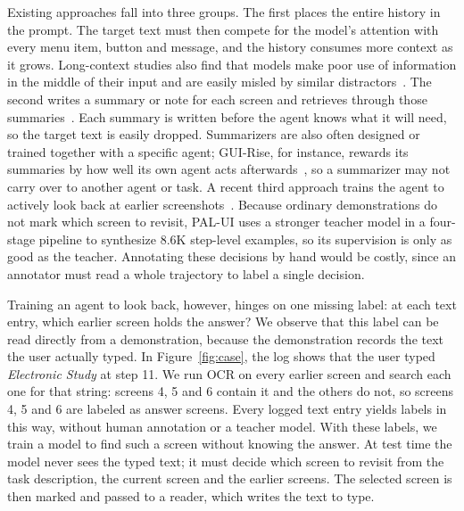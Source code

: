 \documentclass{article}
\begin{document}
Existing approaches fall into three groups. The first places the entire history in the prompt. The target text must then compete for the model's attention with every menu item, button and message, and the history consumes more context as it grows. Long-context studies also find that models make poor use of information in the middle of their input and are easily misled by similar distractors~\citep{lost,ruler,haystacks}. The second writes a summary or note for each screen and retrieves through those summaries~\citep{readagent,memgpt,mobileagente}. Each summary is written before the agent knows what it will need, so the target text is easily dropped. Summarizers are also often designed or trained together with a specific agent; GUI-Rise, for instance, rewards its summaries by how well its own agent acts afterwards~\citep{guirise}, so a summarizer may not carry over to another agent or task. A recent third approach trains the agent to actively look back at earlier screenshots~\citep{palui}. Because ordinary demonstrations do not mark which screen to revisit, PAL-UI uses a stronger teacher model in a four-stage pipeline to synthesize 8.6K step-level examples, so its supervision is only as good as the teacher. Annotating these decisions by hand would be costly, since an annotator must read a whole trajectory to label a single decision.

Training an agent to look back, however, hinges on one missing label: at each text entry, which earlier screen holds the answer? We observe that this label can be read directly from a demonstration, because the demonstration records the text the user actually typed. In Figure~\ref{fig:case}, the log shows that the user typed \emph{Electronic Study} at step 11. We run OCR on every earlier screen and search each one for that string: screens 4, 5 and 6 contain it and the others do not, so screens 4, 5 and 6 are labeled as answer screens. Every logged text entry yields labels in this way, without human annotation or a teacher model. With these labels, we train a model to find such a screen without knowing the answer. At test time the model never sees the typed text; it must decide which screen to revisit from the task description, the current screen and the earlier screens. The selected screen is then marked and passed to a reader, which writes the text to type.
\end{document}
